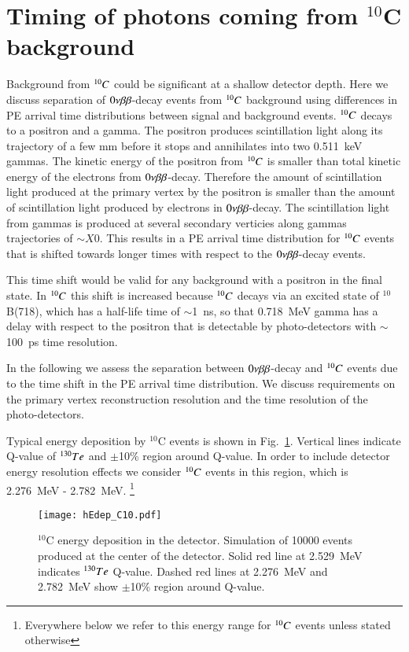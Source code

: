 \section{Timing of photons coming from $^{10}$C background}

Background from $^{10}C$ could be significant at a shallow detector depth.
Here we discuss separation of $0\nu\beta\beta$-decay events from $^{10}C$ background using 
differences in PE arrival time distributions between signal and background events.
$^{10}C$ decays to a positron and a gamma. The positron produces scintillation light 
along its trajectory of a few mm before it stops and annihilates into two 0.511~keV 
gammas. The kinetic energy of the positron from $^{10}C$ is smaller than total kinetic
energy of the electrons from $0\nu\beta\beta$-decay. Therefore the amount of scintillation 
light produced at the primary vertex by the positron is smaller than the amount of 
scintillation light produced by electrons in $0\nu\beta\beta$-decay. The scintillation light from 
gammas is produced at several secondary verticies along gammas trajectories of $\sim X0$. 
This results in a PE arrival time distribution for $^{10}C$ events that is shifted towards 
longer times with respect to the $0\nu\beta\beta$-decay events.

This time shift would be valid for any background with a positron in the final state. In 
$^{10}C$ this shift is increased because $^{10}C$ decays via an excited state of $^{10}$B(718),
which has a half-life time of $\sim$1~ns, so that 0.718~MeV gamma has a delay with respect
to the positron that is detectable by photo-detectors with $\sim$100~ps time resolution.

In the following we assess the separation between $0\nu\beta\beta$-decay and $^{10}C$ events due to the 
time shift in the PE arrival time distribution. We discuss requirements on the primary vertex 
reconstruction resolution and the time resolution of the photo-detectors.

Typical energy deposition by $^{10}$C events is shown in
Fig.~\ref{fig:Edep_C10}. Vertical lines indicate Q-value of $^{130}Te$ and 
$\pm$10\% region around Q-value. In order to include detector energy resolution 
effects we consider $^{10}C$ events in this region, which is 2.276~MeV - 2.782~MeV.
\footnote{Everywhere below we refer to this energy range for $^{10}C$ events unless 
stated otherwise}


\begin{figure}[h]
  \centering
  \texttt{[image: hEdep\_C10.pdf]}
  \caption{$^{10}$C energy deposition in the detector. Simulation of 10000 events
  produced at the center of the detector. Solid red line at 2.529~MeV indicates $^{130}Te$ 
  Q-value. Dashed red lines at 2.276~MeV and 2.782~MeV show $\pm$10\% region around 
  Q-value.}
  \label{fig:Edep_C10}
\end{figure}

